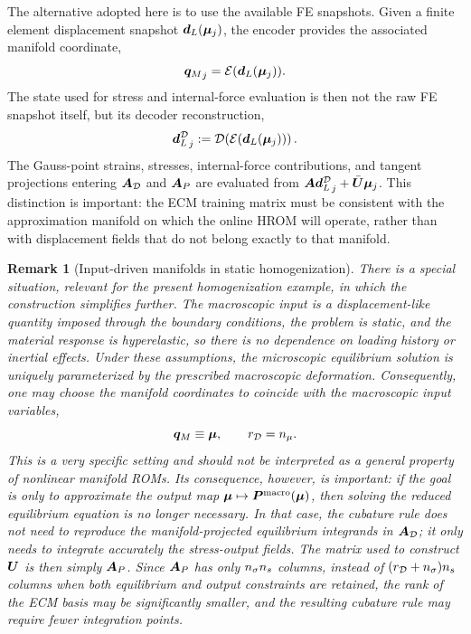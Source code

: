 \documentclass[11pt,a4paper]{article}
\newtheorem{remark}{Remark}
\begin{document}
The alternative adopted here is to use the available FE snapshots. Given a
finite element displacement snapshot $\bm{d}_L(\bm{\mu}_j)$, the encoder provides
the associated manifold coordinate,
\[
    {\bm{q}_M}_j = \mathcal{\boldsymbol{E}}(\bm{d}_L(\bm{\mu}_j)).
\]
The state used for stress and internal-force evaluation is then not the raw FE
snapshot itself, but its decoder reconstruction,
\begin{equation}
\label{eq:dredD_definition}
    {\bm{d}_L^{\mathcal{D}}}_j
    :=
    \mathcal{\boldsymbol{D}}\!\left(\mathcal{\boldsymbol{E}}(\bm{d}_L(\bm{\mu}_j))\right).
\end{equation}
The Gauss-point strains, stresses, internal-force contributions, and tangent
projections entering $\bm{A}_{\mathcal{D}}$ and $\bm{A}_{P}$ are evaluated from
$\bm{A}{\bm{d}_L^{\mathcal{D}}}_j+\bar{\bm{U}}\bm{\mu}_j$. This distinction is important: the ECM
training matrix must be consistent with the approximation manifold on which
the online HROM will operate, rather than with displacement fields that do not
belong exactly to that manifold.

\begin{remark}[Input-driven manifolds in static homogenization]
\label{rem:input_driven_manifold}
There is a special situation, relevant for the present homogenization example,
in which the construction simplifies further. The macroscopic input is a
displacement-like quantity imposed through the boundary conditions, the problem
is static, and the material response is hyperelastic, so there is no dependence
on loading history or inertial effects. Under these assumptions, the
microscopic equilibrium solution is uniquely parameterized by the prescribed
macroscopic deformation. Consequently, one may choose the manifold coordinates
to coincide with the macroscopic input variables,
\[
    \bm{q}_M \equiv \bm{\mu},
    \qquad
    r_{\mathcal{D}}=n_{\mu} .
\]
This is a very specific setting and should not be interpreted as a general
property of nonlinear manifold ROMs. Its consequence, however, is important:
if the goal is only to approximate the output map
$\bm{\mu}\mapsto\bm{P}^{\mathrm{macro}}(\bm{\mu})$, then solving the reduced equilibrium equation
is no longer necessary. In that case, the cubature rule does not need to
reproduce the manifold-projected equilibrium integrands in $\bm{A}_{\mathcal{D}}$; it only
needs to integrate accurately the stress-output fields. The matrix used to
construct $\bm{U}$ is then simply $\bm{A}_{P}$. Since $\bm{A}_{P}$ has only
$n_{\sigma}n_s$ columns, instead of $(r_{\mathcal{D}}+n_{\sigma})n_s$ columns when both
equilibrium and output constraints are retained, the rank of the ECM basis may
be significantly smaller, and the resulting cubature rule may require fewer
integration points.
\end{remark}
\end{document}
